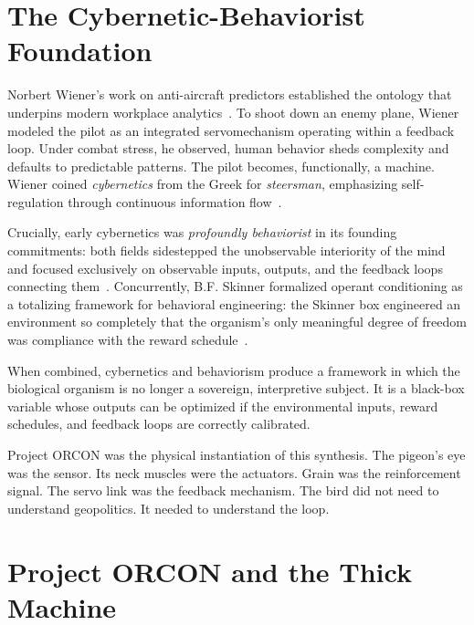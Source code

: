 \documentclass[runningheads]{llncs}
\begin{document}
\section{The Cybernetic-Behaviorist Foundation}

Norbert Wiener's work on anti-aircraft predictors established the ontology that
underpins modern workplace analytics~\cite{wiener1948cybernetics}. To shoot
down an enemy plane, Wiener modeled the pilot as an integrated servomechanism
operating within a feedback loop. Under combat stress, he observed, human
behavior sheds complexity and defaults to predictable patterns. The pilot
becomes, functionally, a machine. Wiener coined \emph{cybernetics} from the
Greek for \emph{steersman}, emphasizing self-regulation through continuous
information flow~\cite{warpeace2025}.

Crucially, early cybernetics was \emph{profoundly behaviorist} in its founding
commitments: both fields sidestepped the unobservable interiority of the mind
and focused exclusively on observable inputs, outputs, and the feedback loops
connecting them~\cite{deeplearning2025}. Concurrently, B.F. Skinner formalized
operant conditioning as a totalizing framework for behavioral engineering: the
Skinner box engineered an environment so completely that the organism's only
meaningful degree of freedom was compliance with the reward
schedule~\cite{skinner1953science}.

When combined, cybernetics and behaviorism produce a framework in which the
biological organism is no longer a sovereign, interpretive subject. It is a
black-box variable whose outputs can be optimized if the environmental inputs,
reward schedules, and feedback loops are correctly calibrated.

Project ORCON was the physical instantiation of this synthesis. The pigeon's
eye was the sensor. Its neck muscles were the actuators. Grain was the
reinforcement signal. The servo link was the feedback mechanism. The bird did
not need to understand geopolitics. It needed to understand the loop.

\section{Project ORCON and the Thick Machine}
\end{document}
